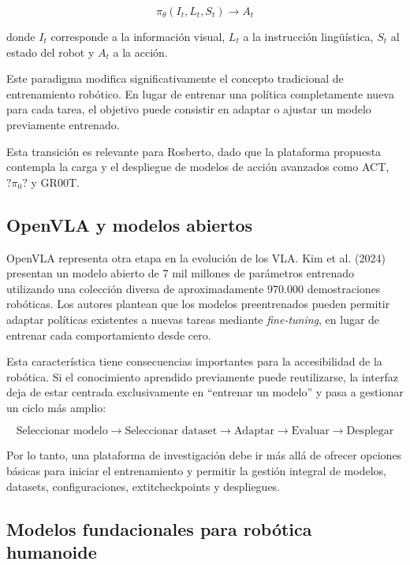 \documentclass[stu,12pt,floatsintext]{apa7}
\begin{document}
\begin{equation}
\pi_{\theta}(I_t,L_t,S_t) \rightarrow A_t
\end{equation}

donde $I_t$ corresponde a la información visual, $L_t$ a la instrucción lingüística, $S_t$ al estado del robot y $A_t$ a la acción.

Este paradigma modifica significativamente el concepto tradicional de entrenamiento robótico. En lugar de entrenar una política completamente nueva para cada tarea, el objetivo puede consistir en adaptar o ajustar un modelo previamente entrenado.

Esta transición es relevante para Rosberto, dado que la plataforma propuesta contempla la carga y el despliegue de modelos de acción avanzados como ACT, $?\pi_0?$ y GR00T.

\subsection{OpenVLA y modelos abiertos}

OpenVLA representa otra etapa en la evolución de los VLA. Kim et al. (2024) presentan un modelo abierto de 7 mil millones de parámetros entrenado utilizando una colección diversa de aproximadamente 970.000 demostraciones robóticas. Los autores plantean que los modelos preentrenados pueden permitir adaptar políticas existentes a nuevas tareas mediante \textit{fine-tuning}, en lugar de entrenar cada comportamiento desde cero.

Esta característica tiene consecuencias importantes para la accesibilidad de la robótica. Si el conocimiento aprendido previamente puede reutilizarse, la interfaz deja de estar centrada exclusivamente en ``entrenar un modelo'' y pasa a gestionar un ciclo más amplio:

\begin{equation}
\text{Seleccionar modelo}
\rightarrow
\text{Seleccionar dataset}
\rightarrow
\text{Adaptar}
\rightarrow
\text{Evaluar}
\rightarrow
\text{Desplegar}
\end{equation}

Por lo tanto, una plataforma de investigación debe ir más allá de ofrecer opciones básicas para iniciar el entrenamiento y permitir la gestión integral de modelos, datasets, configuraciones,  extit{checkpoints} y despliegues.

\subsection{Modelos fundacionales para robótica humanoide}
\end{document}
